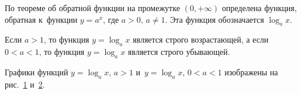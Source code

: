 
По теореме об обратной функции на промежутке $(0, +\infty)$ определена функция,
обратная к~функции $y = a^{x}$, где $a > 0$, $a \ne 1$.
Эта функция обозначается $\log_{a} x$.

Если $a > 1$, то функция $y = \log_{a} x$ является строго возрастающей,
а если $0 < a <1$, то функция $y = \log_{a} x$ является строго убывающей.

Графики функций $y = \log_{a} x$, $a > 1$ и~$y = \log_{a} x$, $0 < a < 1$
изображены на рис.\ \ref{fig:4_3_6_21} и~\ref{fig:4_3_6_22}.

\begin{figure}\label{fig:4_3_6_21}
\end{figure}

\begin{figure}\label{fig:4_3_6_22}
\end{figure}


